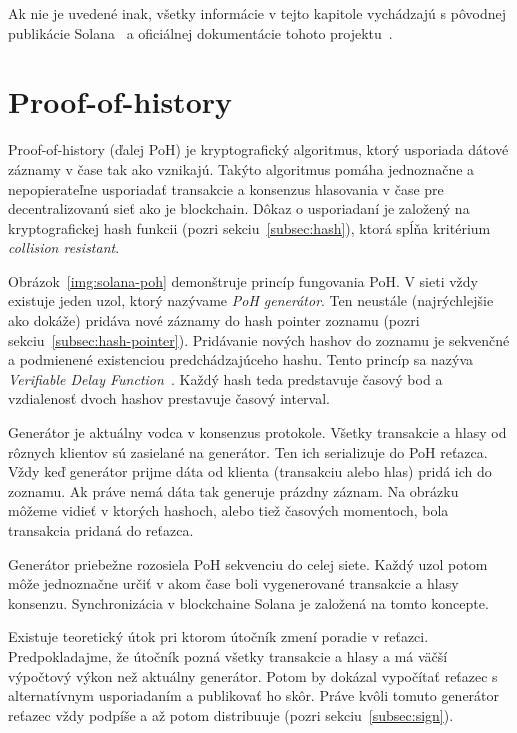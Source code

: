 Ak nie je uvedené inak, všetky informácie v tejto kapitole vychádzajú s pôvodnej publikácie Solana~\cite{solanaWp} a oficiálnej dokumentácie tohoto projektu~\cite{solanaDoc}.

\section{Proof-of-history}\label{sec:solana-poh}

Proof-of-history (ďalej PoH) je kryptografický algoritmus, ktorý usporiada dátové záznamy v čase tak ako vznikajú. Takýto algoritmus pomáha jednoznačne a nepopierateľne usporiadať transakcie a konsenzus hlasovania v čase pre decentralizovanú sieť ako je blockchain. Dôkaz o usporiadaní je založený na kryptografickej hash funkcii (pozri sekciu~\ref{subsec:hash}), ktorá spĺňa kritérium \textit{collision resistant}.

Obrázok~\ref{img:solana-poh} demonštruje princíp fungovania PoH. V sieti vždy existuje jeden uzol, ktorý nazývame \textit{PoH generátor}. Ten neustále (najrýchlejšie ako dokáže) pridáva nové záznamy do hash pointer zoznamu (pozri sekciu~\ref{subsec:hash-pointer}). Pridávanie nových hashov do zoznamu je sekvenčné a podmienené existenciou predchádzajúceho hashu. Tento princíp sa nazýva \textit{Verifiable Delay Function~\cite{vdfBoneh}}. Každý hash teda predstavuje časový bod a vzdialenosť dvoch hashov prestavuje časový interval.

Generátor je aktuálny vodca v konsenzus protokole. Všetky transakcie a hlasy od rôznych klientov sú zasielané na generátor. Ten ich serializuje do PoH reťazca. Vždy keď generátor prijme dáta od klienta (transakciu alebo hlas) pridá ich do zoznamu. Ak práve nemá dáta tak generuje prázdny záznam. Na obrázku môžeme vidieť v ktorých hashoch, alebo tiež časových momentoch, bola transakcia pridaná do reťazca.

Generátor priebežne rozosiela PoH sekvenciu do celej siete. Každý uzol potom môže jednoznačne určiť v akom čase boli vygenerované transakcie a hlasy konsenzu. Synchronizácia v blockchaine Solana je založená na tomto koncepte.

Existuje teoretický útok pri ktorom útočník zmení poradie v reťazci. Predpokladajme, že útočník pozná všetky transakcie a hlasy a má väčší výpočtový výkon než aktuálny generátor. Potom by dokázal vypočítať reťazec s alternatívnym usporiadaním a publikovať ho skôr. Práve kvôli tomuto generátor reťazec vždy podpíše a až potom distribuuje (pozri sekciu~\ref{subsec:sign}).


